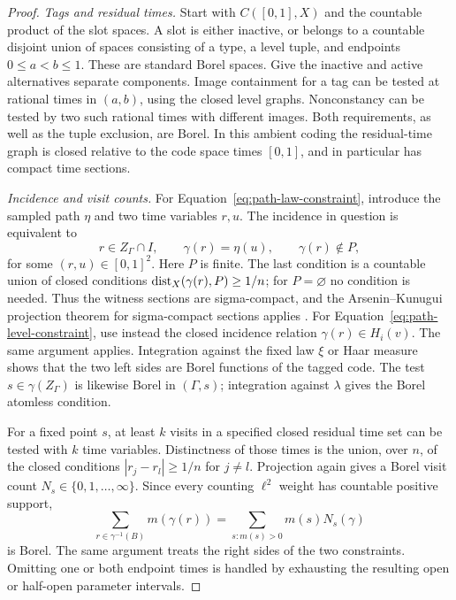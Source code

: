 \begin{proof}
\emph{Tags and residual times.}
Start with $C([0,1],X)$ and the countable product of the slot spaces.
A slot is either inactive, or belongs to a countable disjoint union
of spaces consisting of a type, a level tuple, and endpoints
$0\le a<b\le1$.  These are standard Borel spaces.  Give the inactive
and active alternatives separate components.  Image containment for a
tag can be tested at rational times in $(a,b)$, using the closed level
graphs.  Nonconstancy can be tested by two such rational times with
different images.  Both requirements, as well as the tuple exclusion,
are Borel.  In this ambient coding the residual-time graph is closed
relative to the code space times $[0,1]$, and in particular has compact
time sections.

\emph{Incidence and visit counts.}
For Equation~\eqref{eq:path-law-constraint}, introduce the sampled path
$\eta$ and two time variables $r,u$.  The incidence in question is
equivalent to
\[
 r\in Z_\Gamma\cap I,\qquad
 \gamma(r)=\eta(u),\qquad \gamma(r)\notin P,
\]
for some $(r,u)\in[0,1]^2$.  Here $P$ is finite.  The last condition
is a countable union of closed conditions
$\operatorname{dist}_X(\gamma(r),P)\ge1/n$; for $P=\varnothing$ no condition is
needed.  Thus the witness sections are sigma-compact, and the
Arsenin--Kunugui projection theorem for sigma-compact sections applies
\cite[Theorem~18.18]{Kechris1995}.
For Equation~\eqref{eq:path-level-constraint}, use instead the closed
incidence relation $\gamma(r)\in H_i(v)$.  The same argument applies.
Integration against the fixed law $\xi$ or Haar measure shows that
the two left sides are Borel functions of the tagged code.  The test
$s\in\gamma(Z_\Gamma)$ is likewise Borel in $(\Gamma,s)$; integration
against $\lambda$ gives the Borel atomless condition.

For a fixed point $s$, at least $k$ visits in a specified closed
residual time set can be tested with $k$ time variables.  Distinctness
of those times is the union, over $n$, of the closed conditions
$|r_j-r_l|\ge1/n$ for $j\ne l$.  Projection again gives a Borel
visit count $N_s\in\{0,1,\ldots,\infty\}$.  Since every counting
$\ell^2$ weight has countable positive support,
\[
 \sum_{r\in\gamma^{-1}(B)}m(\gamma(r))
   =\sum_{s:m(s)>0}m(s)N_s(\gamma)
\]
is Borel.  The same argument treats the right sides of the two
constraints.  Omitting one or both endpoint times is handled by
exhausting the resulting open or half-open parameter intervals.


\end{proof}
